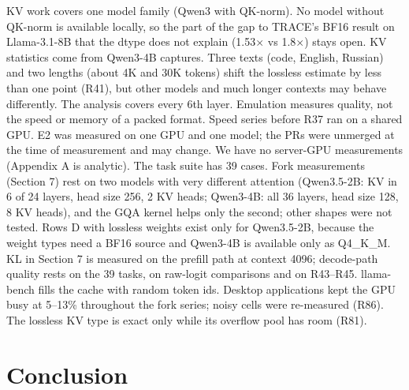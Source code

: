 \documentclass[10pt]{article}
\begin{document}
KV work covers one model family (Qwen3 with QK-norm). No model without QK-norm is available locally, so the
part of the gap to TRACE's BF16 result on Llama-3.1-8B that the dtype does not explain (1.53$\times$ vs 1.8$\times$) stays
open. KV statistics come from Qwen3-4B captures. Three texts (code, English, Russian) and two lengths (about 4K
and 30K tokens) shift the lossless estimate by less than one point (R41), but other models and much longer
contexts may behave differently. The analysis covers every 6th layer. Emulation measures quality, not the speed
or memory of a packed format. Speed series before R37 ran on a shared GPU. E2 was measured on one GPU and one
model; the PRs were unmerged at the time of measurement and may change. We have no server-GPU measurements
(Appendix A is analytic). The task suite has 39 cases. Fork measurements (Section 7) rest on two models with very
different attention (Qwen3.5-2B: KV in 6 of 24 layers, head size 256, 2 KV heads; Qwen3-4B: all 36 layers, head
size 128, 8 KV heads), and the GQA kernel helps only the second; other shapes were not tested. Rows D with
lossless weights exist only for Qwen3.5-2B, because the weight types need a BF16 source and Qwen3-4B is
available only as Q4\_K\_M. KL in Section 7 is measured on the prefill path at context 4096; decode-path quality
rests on the 39 tasks, on raw-logit comparisons and on R43--R45. llama-bench fills the cache with random token
ids. Desktop applications kept the GPU busy at 5--13\% throughout the fork series; noisy cells were re-measured
(R86). The lossless KV type is exact only while its overflow pool has room (R81).

\section{Conclusion}
\end{document}
